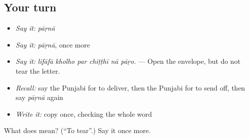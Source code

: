 \subsection*{Your turn}
\begin{itemize}
\raggedright
  \item \emph{Say it:} \emph{pāṛnā}
  \item \emph{Say it:} \emph{pāṛnā}, once more
  \item \emph{Say it:} \emph{lifāfā kholho par chiṭṭhī nā pāṛo.} — Open the envelope, but do not tear the letter.
  \item \emph{Recall:} say the Punjabi for to deliver, then the Punjabi for to send off, then say \emph{pāṛnā} again
  \item \emph{Write it:} copy \textbf{} once, checking the whole word
\end{itemize}

\begin{tcolorbox}[breakable,colback=teal!4,colframe=teal!35!black,title={Before you move on}]
What does  mean? (\textquotedblleft{}To tear\textquotedblright{}.) Say it once more.
\end{tcolorbox}
